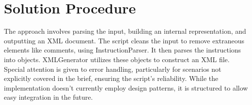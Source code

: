 \documentclass[10pt,a4paper]{article}
\begin{document}
\section{Solution Procedure}
The approach involves parsing the input, building an internal representation, and outputting an XML document. The script cleans the input to remove extraneous elements like comments, using InstructionParser. It then parses the instructions into objects. XMLGenerator utilizes these objects to construct an XML file. Special attention is given to error handling, particularly for scenarios not explicitly covered in the brief, ensuring the script's reliability. While the implementation doesn't currently employ design patterns, it is structured to allow easy integration in the future.
\end{document}
